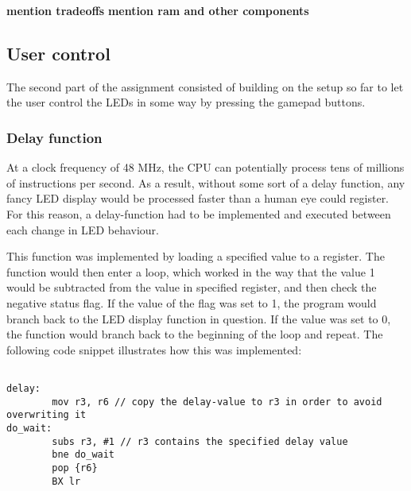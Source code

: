 {\bf mention  tradeoffs}
{\bf mention ram and other components}   




  
\subsection{User control}

The second part of the assignment consisted of building on the setup so far to let the user control the LEDs in some way by pressing the gamepad buttons.

\subsubsection{Delay function}

At a clock frequency of 48 MHz, the CPU can potentially process tens of millions of instructions per second. As a result, without some sort of a delay function, any fancy LED display would be processed faster than a human eye could register. For this reason, a delay-function had to be implemented and executed between each change in LED behaviour.

This function was implemented by loading a specified value to a register. The function would then enter a loop, which worked in the way that the value 1 would be subtracted from the value in specified register, and then check the negative status flag. If the value of the flag was set to 1, the program would branch back to the LED display function in question. If the value was set to 0, the function would branch back to the beginning of the loop and repeat. The following code snippet illustrates how this was implemented:

\begin{lstlisting}

delay:
        mov r3, r6 // copy the delay-value to r3 in order to avoid overwriting it
do_wait:
        subs r3, #1 // r3 contains the specified delay value
        bne do_wait
        pop {r6}
        BX lr
        
\end{lstlisting}

